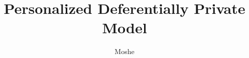 \documentclass[fourier]{_style/dissertation}
\title[Learn personalized model that predicts \textbf{EMG} Signals while Keeping user's privacy]{Personalized Deferentially Private Model}
\author{Moshe}{Beutel}
\begin{document}
\frontmatter





{
  \cleardoublepage%
  \tableofcontents
}


% 

\mainmatter
% 
% 



\nocite{Einstein1905a}                               
\nocite{Einstein1905b}  
\nocite{Einstein1906}   

\printbibliography

% 

\backmatter
% 
% 
% 
% 
\end{document}

